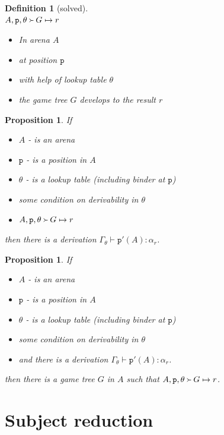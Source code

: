 \documentclass[10pt,a4paper]{article}
\theoremstyle{plain}%
\newtheorem{definition}[theorem]{Definition}
\newtheorem{proposition}[theorem]{Proposition}
\begin{document}
\newcommand{\p}{\mathtt{p}\xspace}

\begin{definition}[solved]~\\

  $A, \p, \theta \Yright G\mapsto r$
  \begin{itemize}
  \item In arena $A$
  \item at position $\p$
  \item with help of lookup table $\theta$
  \item the game tree $G$ develops to the result $r$
  \end{itemize}
\end{definition}

\begin{proposition}
  If
  \begin{itemize}
  \item $A$ - is an arena
  \item $\p$ - is a position in $A$
  \item $\theta$ - is a lookup table (including binder at $\p$)
  \item \emph{some condition on derivability in $\theta$}
  \item $A, \p, \theta \Yright G\mapsto r$
  \end{itemize}
  then there is a derivation $\Gamma_\theta\vdash \p'(A) : \alpha_r$.
\end{proposition}

\begin{proposition}
  If
  \begin{itemize}
  \item $A$ - is an arena
  \item $\p$ - is a position in $A$
  \item $\theta$ - is a lookup table (including binder at $\p$)
  \item \emph{some condition on derivability in $\theta$}
  \item and there is a derivation $\Gamma_\theta\vdash \p'(A) : \alpha_r$. 
  \end{itemize}
  then there is a game tree $G$ in $A$ such that $A,\p,\theta\Yright
  G\mapsto r$.
\end{proposition}

\newpage

\section{Subject reduction}
\end{document}
